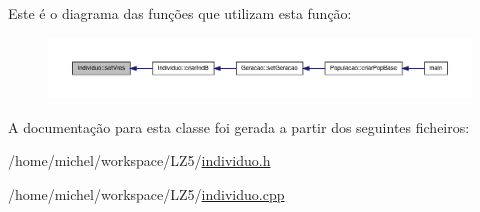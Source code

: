 \-Este é o diagrama das funções que utilizam esta função\-:\nopagebreak
\begin{figure}[H]
\begin{center}
\leavevmode
\includegraphics[width=350pt]{class_individuo_a3271e903e8edcb3bac726a0b3ff1d1a7_icgraph}
\end{center}
\end{figure}




\-A documentação para esta classe foi gerada a partir dos seguintes ficheiros\-:\begin{DoxyCompactItemize}
\item 
/home/michel/workspace/\-L\-Z5/\hyperlink{individuo_8h}{individuo.\-h}\item 
/home/michel/workspace/\-L\-Z5/\hyperlink{individuo_8cpp}{individuo.\-cpp}\end{DoxyCompactItemize}
